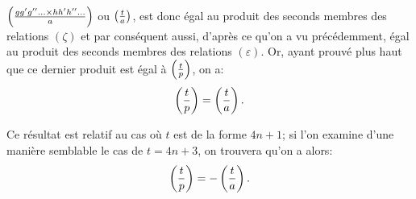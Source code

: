 $\left(\frac{gg'g''\ldots{}\times hh'h''\ldots}{a}\right)$ ou $\left(\frac{t}{a}\right)$, est donc égal au produit des seconds
membres des relations $(\zeta)$ et par conséquent aussi, d'après ce qu'on a vu précédemment, égal
au produit des seconds membres des relations $(\varepsilon)$. Or, ayant prouvé plus haut que ce
dernier produit est égal à $\left(\frac{t}{p}\right)$, on a:
\[
\left(\frac{t}{p}\right)=\left(\frac{t}{a}\right).
\]
\par\indent
Ce résultat est relatif au cas où $t$ est de la forme $4n+1$; si l'on examine d'une manière
semblable le cas de $t=4n+3$, on trouvera qu'on a alors:
\[
\left(\frac{t}{p}\right)=-\left(\frac{t}{a}\right).
\]
